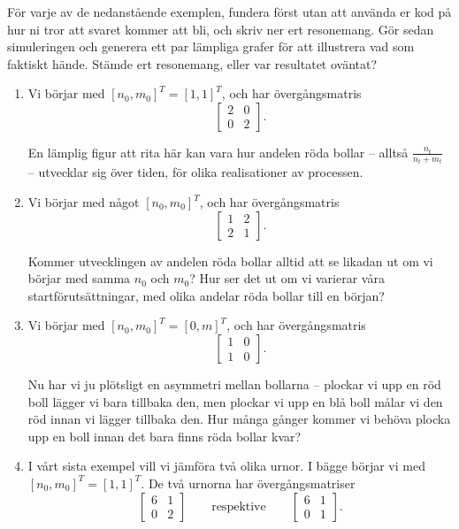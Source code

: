 \documentclass[nobib]{tufte-handout}
\begin{document}
\begin{xca}
    För varje av de nedanstående exemplen, fundera först utan att använda er kod på hur ni tror att svaret kommer att bli, och skriv ner ert resonemang. Gör sedan simuleringen och generera ett par lämpliga grafer för att illustrera vad som faktiskt hände. Stämde ert resonemang, eller var resultatet oväntat?

    \begin{enumerate}
        \item Vi börjar med $[n_0, m_0]^T = [1, 1]^T$, och har övergångsmatris
        $$\begin{bmatrix}
            2 & 0 \\
            0 & 2 
        \end{bmatrix}.$$

        En lämplig figur att rita här kan vara hur andelen röda bollar -- alltså $\frac{n_t}{n_t + m_t}$ -- utvecklar sig över tiden, för olika realisationer av processen.

        \item Vi börjar med något $[n_0, m_0]^T$, och har övergångsmatris
        $$\begin{bmatrix}
            1 & 2 \\
            2 & 1 
        \end{bmatrix}.$$

        Kommer utvecklingen av andelen röda bollar alltid att se likadan ut om vi börjar med samma $n_0$ och $m_0$? Hur ser det ut om vi varierar våra startförutsättningar, med olika andelar röda bollar till en början?

        \item Vi börjar med $[n_0, m_0]^T = [0, m]^T$, och har övergångsmatris
        $$\begin{bmatrix}
            1 & 0 \\
            1 & 0 
        \end{bmatrix}.$$

        Nu har vi ju plötsligt en asymmetri mellan bollarna -- plockar vi upp en röd boll lägger vi bara tillbaka den, men plockar vi upp en blå boll målar vi den röd innan vi lägger tillbaka den. Hur många gånger kommer vi behöva plocka upp en boll innan det bara finns röda bollar kvar?

        \item I vårt sista exempel vill vi jämföra två olika urnor. I bägge börjar vi med $[n_0, m_0]^T = [1,1]^T$. De två urnorna har övergångsmatriser
        $$\begin{bmatrix}
            6 & 1 \\
            0 & 2 
        \end{bmatrix}\qquad\text{respektive}\qquad\begin{bmatrix}
            6 & 1 \\
            0 & 1 
        \end{bmatrix}.$$


\end{enumerate}
\end{xca}
\end{document}
